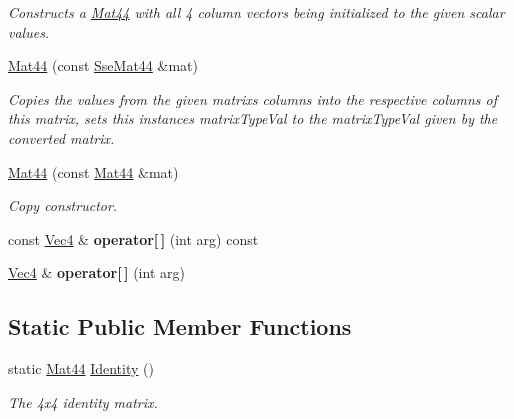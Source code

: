 \begin{DoxyCompactItemize}
\begin{DoxyCompactList}\small\item\em Constructs a \hyperlink{classgofxmath_1_1_mat44}{Mat44} with all 4 column vectors being initialized to the given scalar values. \end{DoxyCompactList}\item 
\hyperlink{classgofxmath_1_1_mat44_afecfdb9f26d2b667ace74a2f7aa02ad8}{Mat44} (const \hyperlink{classgofxmath_1_1_sse_mat44}{Sse\+Mat44} \&mat)
\begin{DoxyCompactList}\small\item\em Copies the values from the given matrix\textquotesingle{}s columns into the respective columns of this matrix, sets this instance\textquotesingle{}s matrix\+Type\+Val to the matrix\+Type\+Val given by the converted matrix. \end{DoxyCompactList}\item 
\hyperlink{classgofxmath_1_1_mat44_a966d4fe8c53854e570e802c7ea7432b4}{Mat44} (const \hyperlink{classgofxmath_1_1_mat44}{Mat44} \&mat)
\begin{DoxyCompactList}\small\item\em Copy constructor. \end{DoxyCompactList}\item 
\hypertarget{classgofxmath_1_1_mat44_af1200cebfc1e017a9620c329a48983bc}{}const \hyperlink{classgofxmath_1_1_vec4}{Vec4} \& {\bfseries operator\mbox{[}$\,$\mbox{]}} (int arg) const \label{classgofxmath_1_1_mat44_af1200cebfc1e017a9620c329a48983bc}

\item 
\hypertarget{classgofxmath_1_1_mat44_a9bc95dac89f379fd7a8705e1bd991fb9}{}\hyperlink{classgofxmath_1_1_vec4}{Vec4} \& {\bfseries operator\mbox{[}$\,$\mbox{]}} (int arg)\label{classgofxmath_1_1_mat44_a9bc95dac89f379fd7a8705e1bd991fb9}

\end{DoxyCompactItemize}
\subsection*{Static Public Member Functions}
\begin{DoxyCompactItemize}
\item 
static \hyperlink{classgofxmath_1_1_mat44}{Mat44} \hyperlink{classgofxmath_1_1_mat44_ab29ffef6b95835a3b7e9ac8f58cc2cd4}{Identity} ()
\begin{DoxyCompactList}\small\item\em The 4x4 identity matrix. \end{DoxyCompactList}\end{DoxyCompactItemize}
